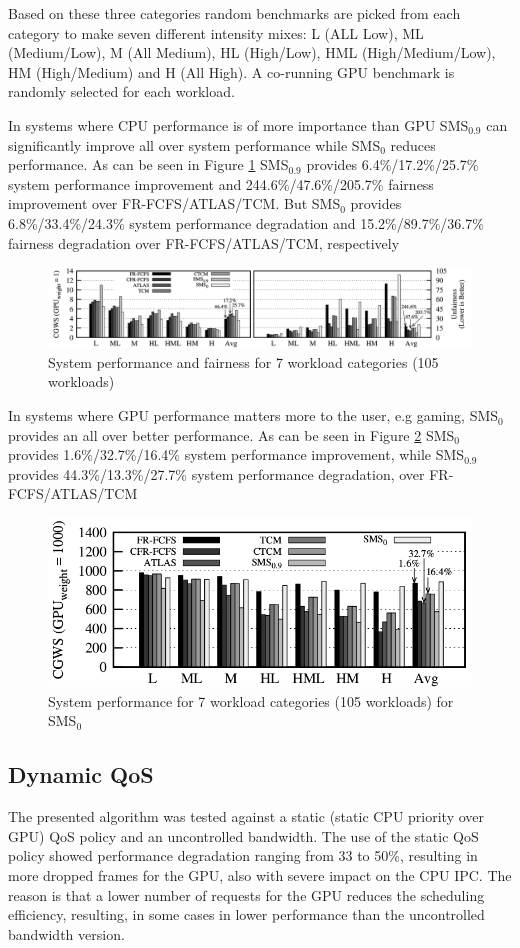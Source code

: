 \documentclass[10pt,journal,compsoc]{IEEEtran}
\begin{document}
Based on these three categories random benchmarks are picked from each category to make seven different intensity mixes: L (ALL Low), ML (Medium/Low), M (All Medium), HL (High/Low),  HML (High/Medium/Low),  HM (High/Medium) and H (All High).  A co-running GPU benchmark is randomly selected for each workload.

In systems where CPU performance is of more importance than GPU SMS$_{0.9}$ can significantly improve all over system performance while SMS$_0$ reduces performance. As can be seen in Figure \ref{fig:SmS_GPU_1} SMS$_{0.9}$ provides 6.4\%/17.2\%/25.7\% system performance improvement and 244.6\%/47.6\%/205.7\% fairness improvement over FR-FCFS/ATLAS/TCM.
But SMS$_0$ provides 6.8\%/33.4\%/24.3\% system performance degradation and 15.2\%/89.7\%/36.7\% fairness degradation over FR-FCFS/ATLAS/TCM, respectively \cite{SmS}

\begin{figure}[H]
	\centering
	\includegraphics[width = 9.2 cm]{graphics/GPU_W_1.png}
	\caption{System performance and fairness for 7 workload categories (105 workloads) \cite{SmS}}\label{fig:SmS_GPU_1}
\end{figure}

In systems where GPU performance matters more to the user, e.g gaming, SMS$_0$ provides an all over better performance.  As can be seen in Figure \ref{fig:SmS_GPU_1000}  SMS$_0$ provides 1.6\%/32.7\%/16.4\% system performance improvement, while SMS$_{0.9}$ provides 44.3\%/13.3\%/27.7\% system performance degradation, over FR-FCFS/ATLAS/TCM

\begin{figure}[H]
	\centering
	\includegraphics[width = 9 cm]{graphics/GPU_W_1000.png}
	\caption{System performance for 7 workload categories (105 workloads) for SMS$_0$ \cite{SmS}}\label{fig:SmS_GPU_1000}
\end{figure}

\subsection{Dynamic QoS}
The presented algorithm was tested against a static (static CPU priority over GPU) QoS policy and an uncontrolled bandwidth. The use of the static QoS policy showed performance degradation ranging from 33 to 50\%, resulting in more dropped frames for the GPU, also with severe impact on the CPU IPC. The reason is that a lower number of requests for the GPU reduces the scheduling efficiency, resulting, in some cases in lower performance than the uncontrolled bandwidth version.
\end{document}
